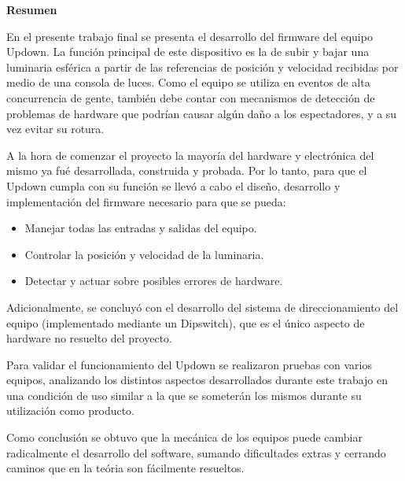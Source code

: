 \thispagestyle{empty}
\begin{center}

	\textbf{\huge Resumen }\\[1cm] 

\end{center}

En el presente trabajo final se presenta el desarrollo del firmware del equipo Updown. La función principal de este dispositivo es la de subir y bajar una luminaria esférica a partir de las referencias de posición y velocidad recibidas por medio de una consola de luces. Como el equipo se utiliza en eventos de alta concurrencia de gente, también debe contar con mecanismos de detección de problemas de hardware que podrían causar algún daño a los espectadores, y a su vez evitar su rotura.

A la hora de comenzar el proyecto la mayoría del hardware y electrónica del mismo ya fué desarrollada, construida y probada. Por lo tanto, para que el Updown cumpla con su función se llevó a cabo el diseño, desarrollo y implementación del firmware necesario para que se pueda:

\begin{itemize}
	\item Manejar todas las entradas y salidas del equipo.
	\item Controlar la posición y velocidad de la luminaria.
	\item Detectar y actuar sobre posibles errores de hardware.
\end{itemize}

Adicionalmente, se concluyó con el desarrollo del sistema de direccionamiento del equipo (implementado mediante un Dipswitch), que es el único aspecto de hardware no resuelto del proyecto.

Para validar el funcionamiento del Updown se realizaron pruebas con varios equipos, analizando los distintos aspectos desarrollados durante este trabajo en una condición de uso similar a la que se someterán los mismos durante su utilización como producto.

Como conclusión se obtuvo que la mecánica de los equipos puede cambiar radicalmente el desarrollo del software, sumando dificultades extras y cerrando caminos que en la teória son fácilmente resueltos.


